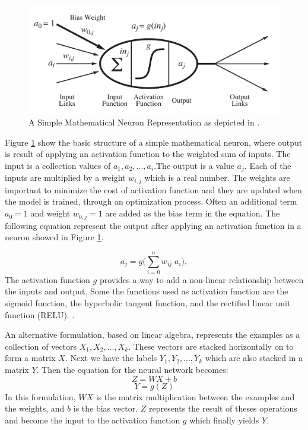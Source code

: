 \documentclass[12pt]{report}
\begin{document}
\begin{figure}[H]	
	\centering
	\includegraphics[width=160mm, scale = 1]{images/3_neuron.png}	
	\caption{A Simple Mathematical Neuron Representation as depicted in \cite{Russell2010}.}	
	\label{figure:Mathematical_Neuron}
\end{figure}

Figure \ref{figure:Mathematical_Neuron} show the basic structure of a simple mathematical neuron, where output is result of applying an activation function to the weighted sum of inputs. The input is a collection values of $a_1, a_2, ..., a_i$.The output is a value $a_j$. Each of the inputs are multiplied by a weight $w_{i,j}$ which is a real number. The weights are important to minimize the cost of activation function and they are updated when the model is trained, through an optimization process. Often an additional term $a_0=1$ and weight $w_{0,j}=1$ are added as the bias term in the equation. The following equation represent the output after applying an activation function in a neuron showed in Figure \ref{figure:Mathematical_Neuron}.

\begin{equation}
a_j=g\Biggl(\sum_{i=0}^{n} w_{ij}\; a_i\Biggr),
\end{equation}
The activation function $g$ provides a way to add a non-linear relationship between the inputs and output. Some the functions used as activation function are the sigmoid function, the hyperbolic tangent function, and the rectified linear unit function (RELU). \cite{Goodfellow2016}. 

An alternative formulation, based on linear algebra, represents the examples as a collection of vectors $X_1, X_2, ..., X_k$. These vectors 
are stacked horizontally on to form a matrix $X$. Next we have the labels $Y_1, Y_2, ..., Y_k$ which are also stacked in a matrix $Y$. 
Then the equation for the neural network becomes: 
\[
Z = WX + b
\]
\[
Y = g(Z)
\]
In this formulation, $WX$ is the matrix multiplication between the examples and the weights, and $b$ is the bias vector. $Z$ represents the 
result of theses operations and become the input to the activation function $g$ which finally yields $Y$.
\end{document}
